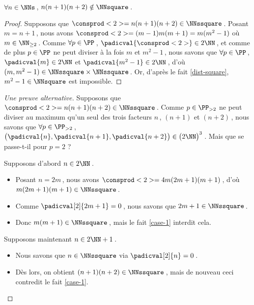 \begin{fact} \label{case-2}
	 $\forall n \in \NNs$\,, $n(n+1)(n+2) \notin \NNsquare$\,.
\end{fact}




\begin{proof}
    Supposons que $\consprod<2> = n(n+1)(n+2) \in \NNssquare$\,.
    Posant $m = n+1$\,, nous avons $\consprod<2> = (m-1)m(m+1) = m(m^2 - 1)$ où $m \in \NN_{\geq 2}$\,.
    Comme $\forall p \in \PP$\,, $\padicval{\consprod<2>} \in 2 \NN$\,, et comme de plus $p \in \PP$ ne peut diviser à la fois $m$ et $m^2 - 1$\,, nous savons que 
    $\forall p \in \PP$\,, 
    $\padicval{m} \in 2 \NN$ et $\padicval{m^2 - 1} \in 2 \NN$\,,
    d'où 
    $(m, m^2 - 1) \in \NNssquare \times \NNssquare$\,.
    Or, d'après le fait \ref{dist-square}, $m^2 - 1 \in \NNsquare$ est impossible.
\end{proof}




\begin{proof}[Une preuve alternative]
    Supposons que $\consprod<2> = n(n+1)(n+2) \in \NNssquare$\,.
    Comme $p \in \PP_{>2}$ ne peut diviser au maximum qu'un seul des trois facteurs $n$\,, $(n+1)$ et $(n+2)$\,, nous savons que 
    $\forall p \in \PP_{>2}$\,, 
    $\big( \padicval{n} , \padicval{n + 1} , \padicval{n + 2} \big) \in \big( 2 \NN \big)^3$\,.
    Mais que se passe-t-il pour $p = 2$ ?
    
    \medskip
    
    Supposons d'abord $n \in 2 \NN$\,.
	\begin{itemize}
		\item Posant $n = 2 m$\,, nous avons $\consprod<2> = 4 m(2m+1)(m+1)$\,, d'où $m(2m+1)(m+1) \in \NNssquare$\,.
		
		\item Comme $\padicval[2]{2m+1} = 0$\,, nous savons que $2m+1 \in \NNssquare$\,.
		
		\item Donc $m(m+1)\in \NNssquare$\,, mais le fait \ref{case-1} interdit cela.
	\end{itemize}
    
    \medskip
    
    Supposons maintenant $n \in 2 \NN + 1$\,.
	\begin{itemize}
		\item Nous savons que $n \in \NNssquare$ via $\padicval[2]{n} = 0$\,.

		\item Dès lors, on obtient $(n+1)(n+2) \in \NNssquare$\,, mais de nouveau ceci contredit le fait \ref{case-1}. \qedhere
	\end{itemize}
\end{proof}